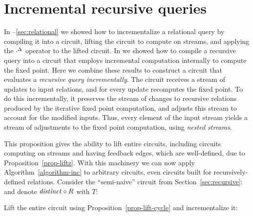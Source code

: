 \section{Incremental recursive queries}\label{sec:inc-recursive}

In --\ref{sec:relational}
we showed how to incrementalize a relational query by
compiling it into a circuit, lifting the circuit to compute on streams, and
applying the ${\cdot}^{\Delta}$ operator to the lifted circuit.  In  we showed
how to compile a recursive query into a circuit that employs incremental
computation internally to compute the fixed point.
Here we combine these results to construct a circuit that evaluates a \emph{recursive
query incrementally}.  The circuit receives a stream of updates to input
relations, and for every update recomputes the fixed point.  To do this
incrementally, it preserves the stream of changes to recursive relations
produced by the iterative fixed point computation, and adjusts this stream to
account for the modified inputs.  Thus, every element of the input stream yields
a stream of adjustments to the fixed point computation, using
\emph{nested streams}.

This proposition gives the ability to lift
entire circuits, including circuits computing on streams and having feedback edges,
which are well-defined, due to Proposition~\ref{prop-liftz}.
With this machinery we can now apply Algorithm~\ref{algorithm-inc} to arbitrary
circuits, even circuits built for recursively-defined relations.
Consider the ``semi-naive'' circuit from Section~\ref{sec:recursive}:
and denote $\mathit{distinct} \circ R$ with $T$:

\begin{center}
\vspace{-2mm}
\end{center}

\noindent Lift the entire circuit using Proposition~\ref{prop-lift-cycle} and incrementalize it:

